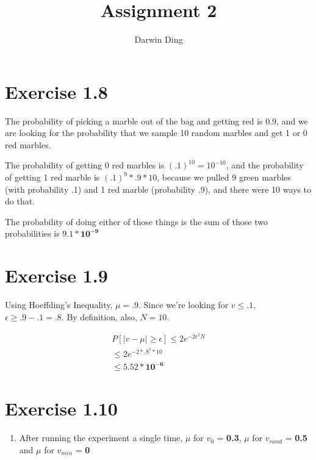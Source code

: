 \documentclass[12pt]{article}
\begin{document}
\title{Assignment 2}
\author{Darwin Ding}
\maketitle

\section*{Exercise 1.8}
The probability of picking a marble out of the bag and getting red is 0.9, and we are looking for the probability that we sample 10 random marbles and get 1 or 0 red marbles.

The probability of getting 0 red marbles is $(.1)^{10} = 10^{-10}$, and the probability of getting 1 red marble is $(.1)^9 * .9 * 10$, because we pulled 9 green marbles (with probability .1) and 1 red marble (probability .9), and there were 10 ways to do that.

The probability of doing either of those things is the sum of those two probabilities is $\boldsymbol{9.1 * 10^{-9}}$

\section*{Exercise 1.9}
Using Hoeffding's Inequality, $\mu = .9$. Since we're looking for $v \le .1$, $\epsilon \ge .9 - .1 = .8$. By definition, also, $N = 10$.

\begin{gather*}
P[|v - \mu| \ge \epsilon] \le 2e^{-2\epsilon^{2}N}
\\ \le 2e^{-2 * .8^2 * 10}
\\ \le \boldsymbol{5.52 * 10^{-6}}
\end{gather*}

\section*{Exercise 1.10}
\begin{enumerate}[label=(\alph*)]
	\item After running the experiment a single time, $\mu$ for $v_0$ = \textbf{0.3}, $\mu$ for $v_{rand}$ = \textbf{0.5} and $\mu$ for $v_{min}$ = \textbf{0}
\end{enumerate}
\end{document}
